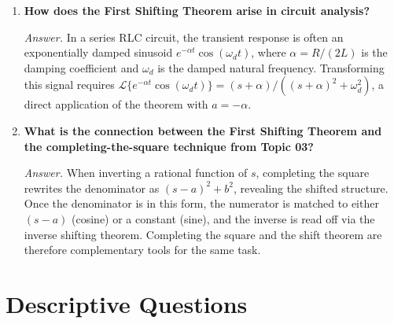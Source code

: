 \documentclass[12pt,a4paper]{article}
\begin{document}
\begin{enumerate}[label=\textbf{Q\arabic*.}, leftmargin=*, itemsep=1em]
\item \textbf{How does the First Shifting Theorem arise in circuit analysis?}

\textit{Answer.}
In a series RLC circuit, the transient response is often an exponentially damped sinusoid
$e^{-\alpha t}\cos(\omega_d t)$, where $\alpha = R/(2L)$ is the damping coefficient and
$\omega_d$ is the damped natural frequency.
Transforming this signal requires $\mathcal{L}\{e^{-\alpha t}\cos(\omega_d t)\} = (s+\alpha)/((s+\alpha)^2+\omega_d^2)$,
a direct application of the theorem with $a = -\alpha$.

\item \textbf{What is the connection between the First Shifting Theorem and the completing-the-square technique from Topic 03?}

\textit{Answer.}
When inverting a rational function of $s$, completing the square rewrites the denominator as
$(s-a)^2 + b^2$, revealing the shifted structure.
Once the denominator is in this form, the numerator is matched to either $(s-a)$ (cosine) or
a constant (sine), and the inverse is read off via the inverse shifting theorem.
Completing the square and the shift theorem are therefore complementary tools for the same task.

\end{enumerate}

\section{Descriptive Questions}
\end{document}
